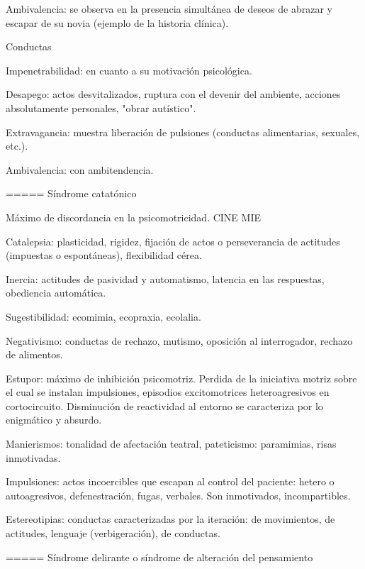 \documentclass{scrbook}
\begin{document}
Ambivalencia: se observa en la presencia simultánea de deseos de abrazar y escapar de su novia (ejemplo de la historia clínica).

Conductas

Impenetrabilidad: en cuanto a su motivación psicológica.

Desapego: actos desvitalizados, ruptura con el devenir del ambiente, acciones absolutamente personales, "obrar autístico".

Extravagancia: muestra liberación de pulsiones (conductas alimentarias, sexuales, etc.).

Ambivalencia: con ambitendencia.

===== Síndrome catatónico

Máximo de discordancia en la psicomotricidad. CINE MIE

Catalepsia: plasticidad, rigidez, fijación de actos o perseverancia de actitudes (impuestas o espontáneas), flexibilidad cérea.

Inercia: actitudes de pasividad y automatismo, latencia en las respuestas, obediencia automática.

Sugestibilidad: ecomimia, ecopraxia, ecolalia.

Negativismo: conductas de rechazo, mutismo, oposición al interrogador, rechazo de alimentos.

Estupor: máximo de inhibición psicomotriz. Perdida de la iniciativa motriz sobre el cual se instalan impulsiones, episodios excitomotrices heteroagresivos en cortocircuito. Disminución de reactividad al entorno se caracteriza por lo enigmático y absurdo.

Manierismos: tonalidad de afectación teatral, pateticismo: paramimias, risas inmotivadas.

Impulsiones: actos incoercibles que escapan al control del paciente: hetero o autoagresivos, defenestración, fugas, verbales. Son inmotivados, incompartibles.

Estereotipias: conductas caracterizadas por la iteración: de movimientos, de actitudes, lenguaje (verbigeración), de conductas.

===== Síndrome delirante o síndrome de alteración del pensamiento
\end{document}

